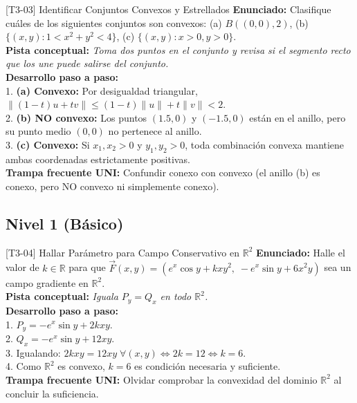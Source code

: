 \documentclass[11pt,a4paper]{article}
\begin{document}
\begin{ejerciciobox}{[T3-03] Identificar Conjuntos Convexos y Estrellados}
\textbf{Enunciado:} Clasifique cuáles de los siguientes conjuntos son convexos: (a) $B((0,0), 2)$, (b) $\{(x,y) : 1 < x^2+y^2 < 4\}$, (c) $\{(x,y) : x > 0, y > 0\}$.\\[0.2cm]
\textbf{Pista conceptual:} \emph{Toma dos puntos en el conjunto y revisa si el segmento recto que los une puede salirse del conjunto.}\\[0.2cm]
\textbf{Desarrollo paso a paso:}\\
1. \textbf{(a) Convexo:} Por desigualdad triangular, $\|(1-t)u + tv\| \le (1-t)\|u\| + t\|v\| < 2$.\\
2. \textbf{(b) NO convexo:} Los puntos $(1.5, 0)$ y $(-1.5, 0)$ están en el anillo, pero su punto medio $(0,0)$ no pertenece al anillo.\\
3. \textbf{(c) Convexo:} Si $x_1, x_2 > 0$ y $y_1, y_2 > 0$, toda combinación convexa mantiene ambas coordenadas estrictamente positivas.\\[0.2cm]
\textbf{Trampa frecuente UNI:} Confundir conexo con convexo (el anillo (b) es conexo, pero NO convexo ni simplemente conexo).
\end{ejerciciobox}

\subsection{Nivel 1 (Básico)}

\begin{ejerciciobox}{[T3-04] Hallar Parámetro para Campo Conservativo en $\mathbb{R}^2$}
\textbf{Enunciado:} Halle el valor de $k \in \mathbb{R}$ para que $\vec{F}(x,y) = (e^x\cos y + kxy^2,\; -e^x\sin y + 6x^2y)$ sea un campo gradiente en $\mathbb{R}^2$.\\[0.2cm]
\textbf{Pista conceptual:} \emph{Iguala $P_y = Q_x$ en todo $\mathbb{R}^2$.}\\[0.2cm]
\textbf{Desarrollo paso a paso:}\\
1. $P_y = -e^x\sin y + 2kxy$.\\
2. $Q_x = -e^x\sin y + 12xy$.\\
3. Igualando: $2kxy = 12xy\; \forall(x,y) \iff 2k = 12 \iff k = 6$.\\
4. Como $\mathbb{R}^2$ es convexo, $k = 6$ es condición necesaria y suficiente.\\[0.2cm]
\textbf{Trampa frecuente UNI:} Olvidar comprobar la convexidad del dominio $\mathbb{R}^2$ al concluir la suficiencia.
\end{ejerciciobox}
\end{document}
